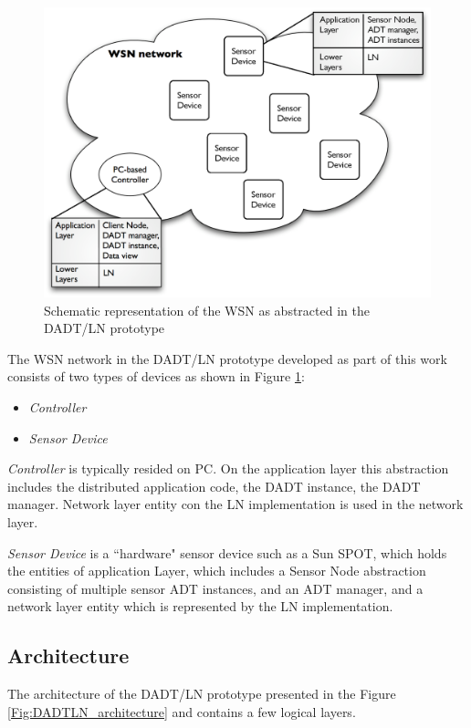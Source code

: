 \begin{figure}
\centering
\includegraphics[scale=0.55]{img/DADTLN_glossary.eps} 
\caption[WSN in DADT/LN prototype]{Schematic representation of the WSN as
abstracted in the DADT/LN prototype}
\label{Fig:DADTLN_glossary}
\end{figure} 

The WSN network in the DADT/LN prototype developed as part of
this work consists of two types of devices as shown in Figure
\ref{Fig:DADTLN_glossary}:
\begin{itemize}
  \item \emph{Controller}
  \item \emph{Sensor Device}
\end{itemize}  
   
\emph{Controller} is typically resided on PC. On the application layer this
abstraction includes the distributed application code, the DADT
instance, the DADT manager. Network layer entity con the LN implementation is
used in the network layer.
  
\emph{Sensor Device} is a ``hardware" sensor device such as a Sun SPOT, 
which holds the entities of application Layer, which includes a Sensor Node
abstraction consisting of multiple sensor ADT instances, and an ADT
manager, and a network layer entity which is represented by the LN implementation.

\subsection{Architecture}

The architecture of the DADT/LN prototype presented in the Figure
\ref{Fig:DADTLN_architecture} and contains a few logical layers.

